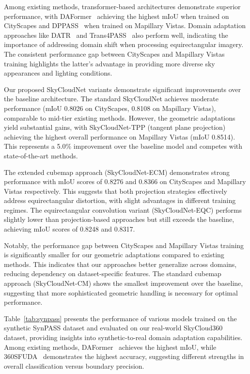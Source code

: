 \documentclass[conference]{IEEEtran}
\begin{document}
Among existing methods, transformer-based architectures demonstrate superior performance, with DAFormer~\cite{hoyer2022daformer} achieving the highest mIoU when trained on CityScapes and DPPASS~\cite{zheng2023both} when trained on Mapillary Vistas. 
Domain adaptation approaches like DATR~\cite{zheng2023look} and Trans4PASS~\cite{zhang2022bending} also perform well, indicating the importance of addressing domain shift when processing equirectangular imagery. The consistent performance gap between CityScapes and Mapillary Vistas training highlights the latter's advantage in providing more diverse sky appearances and lighting conditions.

Our proposed SkyCloudNet variants demonstrate significant improvements over the baseline architecture. The standard SkyCloudNet achieves moderate performance (mIoU 0.8026 on CityScapes, 0.8108 on Mapillary Vistas), comparable to mid-tier existing methods. However, the geometric adaptations yield substantial gains, with SkyCloudNet-TPP (tangent plane projection) achieving the highest overall performance on Mapillary Vistas (mIoU 0.8514). This represents a 5.0\% improvement over the baseline model and competes with state-of-the-art methods.

The extended cubemap approach (SkyCloudNet-ECM) demonstrates strong performance with mIoU scores of 0.8276 and 0.8366 on CityScapes and Mapillary Vistas respectively. This suggests that both projection strategies effectively address equirectangular distortion, with slight advantages in different training regimes. The equirectangular convolution variant (SkyCloudNet-EQC) performs slightly lower than projection-based approaches but still exceeds the baseline, achieving mIoU scores of 0.8248 and 0.8317.

Notably, the performance gap between CityScapes and Mapillary Vistas training is significantly smaller for our geometric adaptations compared to existing methods. This indicates that our approaches better generalize across domains, reducing dependency on dataset-specific features. The standard cubemap approach (SkyCloudNet-CM) shows the smallest improvement over the baseline, suggesting that more sophisticated geometric handling is necessary for optimal performance.

Table~\ref{tab:synpass} presents the performance of various models trained on the synthetic SynPASS dataset and evaluated on our real-world SkyCloud360 dataset, providing insights into synthetic-to-real domain adaptation capabilities. Among existing methods, DAFormer~\cite{hoyer2022daformer} achieves the highest mIoU, while 360SFUDA~\cite{zheng2024semantics} demonstrates the highest accuracy, suggesting different strengths in overall classification versus boundary precision.
\end{document}
